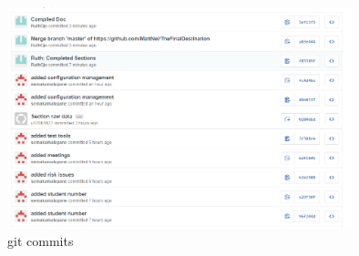 \begin{figure}[H]
  		\centering
      	\includegraphics[width=100mm]{gitCommitsOne}	      	
  		\caption{git commits}
\end{figure}

